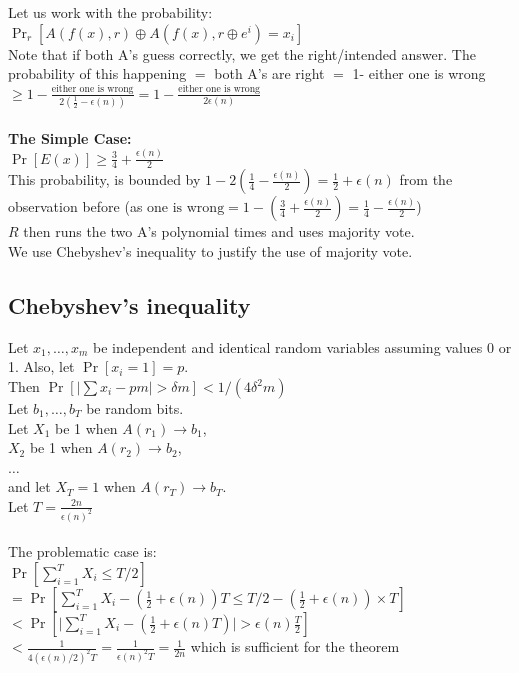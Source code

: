 \documentclass[12pt]{tufte-book}
\begin{document}
Let us work with the probability: $\Pr_{r}[A(f(x), r) \oplus A(f(x), r \oplus e^i) = x_i]$\\
		Note that if both A's guess correctly, we get the right/intended answer.
		The probability of this happening $=$ both A's are right $=$ 1- either one is wrong $\ge  1-\frac{\text{either one is wrong}}{2 (\frac{1}{2}-\epsilon(n))} = 1 - \frac{\text{either one is wrong}}{2 \epsilon(n)}$\\\\
\textbf{The Simple Case:}\\
	$\Pr[E(x)] \ge \frac{3}{4}+\frac{\epsilon(n)}{2}$\\
	This probability, is bounded by $1-2(\frac{1}{4} - \frac{\epsilon(n)}{2}) = \frac{1}{2} + \epsilon(n)$ from the observation before (as $\text{one is wrong} = 1- (\frac{3}{4}+\frac{\epsilon(n)}{2}) = \frac{1}{4} - \frac{\epsilon(n)}{2}$)\\
	$R$ then runs the two A's polynomial times and uses majority vote.\\
	We use Chebyshev's inequality to justify the use of majority vote.

\subsection{Chebyshev's inequality} %
	Let $x_1,\ldots,x_m$ be independent and identical random variables assuming values 0 or 1.  Also, let $\Pr[x_i=1] = p$.\\
		Then $\Pr[ \lvert \sum x_i - pm \rvert > \delta m] < 1/(4\delta^2 m)$\\

	Let $b_1,\ldots,b_T$ be random bits.\\
	Let $X_1$ be 1 when $A(r_1) \rightarrow b_1$,\\
	$X_2$ be 1 when $A(r_2) \rightarrow b_2$,\\
	$\ldots$\\
	and let $X_T=1$ when $A(r_T) \rightarrow b_T$.\\
	Let $T=\frac{2n}{\epsilon(n)^2}$\\\\

The problematic case is:\\
	$\Pr[ \sum_{i=1}^T X_i \le T/2]$\\
	$= \Pr[ \sum_{i=1}^T X_i - (\frac{1}{2} + \epsilon(n)) T \le T/2 - (\frac{1}{2}+\epsilon(n))\times T]$\\
	$< \Pr[ \lvert \sum_{i=1}^T X_i - (\frac{1}{2}+\epsilon(n) T)\rvert > \epsilon(n) \frac{T}{2} ]$\\
	$< \frac{1}{4 (\epsilon(n)/2)^2 T} = \frac{1}{\epsilon(n)^2 T} = \frac{1}{2n}$ which is sufficient for the theorem\\\\
\end{document}

